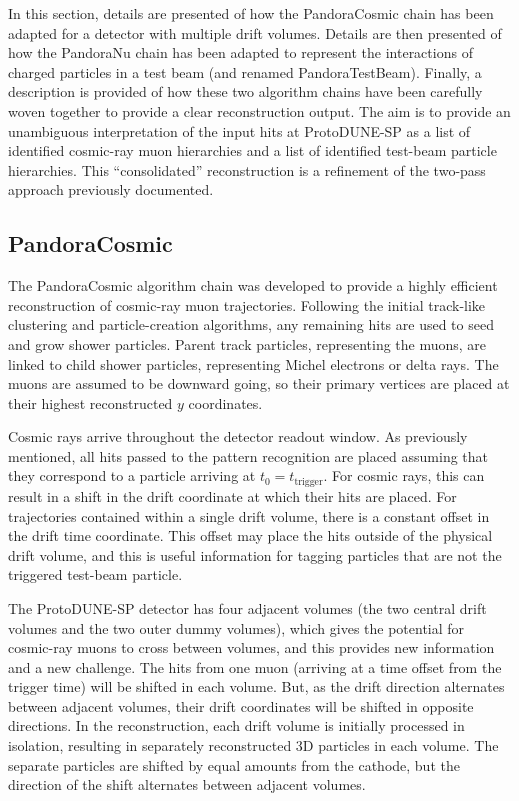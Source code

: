 \documentclass[epjc3]{svjour3}
\begin{document}
In this section, details are presented of how the PandoraCosmic chain has been adapted for a detector with multiple drift volumes. Details are then presented of how the PandoraNu chain has been adapted to represent the interactions of charged particles in a test beam (and renamed PandoraTestBeam). Finally, a description is provided of how these two algorithm chains have been carefully woven together to provide a clear reconstruction output. The aim is to provide an unambiguous interpretation of the input hits at ProtoDUNE-SP as a list of identified cosmic-ray muon hierarchies and a list of identified test-beam particle hierarchies. This ``consolidated'' reconstruction is a refinement of the two-pass approach previously documented.

\subsection{PandoraCosmic}
\label{sec:pandoracosmic}

The PandoraCosmic algorithm chain was developed to provide a highly efficient reconstruction of cosmic-ray muon trajectories. Following the initial track-like clustering and particle-creation algorithms, any remaining hits are used to seed and grow shower particles. Parent track particles, representing the muons, are linked to child shower particles, representing Michel electrons or delta rays. The muons are assumed to be downward going, so their primary vertices are placed at their highest reconstructed $y$ coordinates.

Cosmic rays arrive throughout the detector readout window. As previously mentioned, all hits passed to the pattern recognition are placed assuming that they correspond to a particle arriving at $t_0=t_\textrm{trigger}$. For cosmic rays, this can result in a shift in the drift coordinate at which their hits are placed. For trajectories contained within a single drift volume, there is a constant offset in the drift time coordinate. This offset may place the hits outside of the physical drift volume, and this is useful information for tagging particles that are not the triggered test-beam particle.

The ProtoDUNE-SP detector has four adjacent volumes (the two central drift volumes and the two outer dummy volumes), which gives the potential for cosmic-ray muons to cross between volumes, and this provides new information and a new challenge. The hits from one muon (arriving at a time offset from the trigger time) will be shifted in each volume. But, as the drift direction alternates between adjacent volumes, their drift coordinates will be shifted in opposite directions. In the reconstruction, each drift volume is initially processed in isolation, resulting in separately reconstructed 3D particles in each volume. The separate particles are shifted by equal amounts from the cathode, but the direction of the shift alternates between adjacent volumes.
\end{document}
